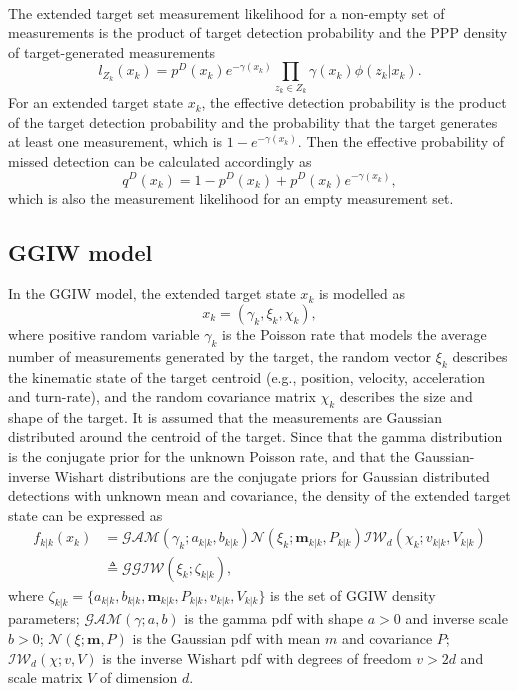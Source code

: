 ~\\
The extended target set measurement likelihood for a non-empty set of measurements is the product of target detection probability and the PPP density of target-generated measurements \cite{pmbmextended2}
\begin{equation}
    l_{Z_k}(x_k) = p^D(x_k)e^{-\gamma(x_k)}\prod_{z_k\in Z_k}\gamma(x_k)\phi(z_k|x_k).
    \label{eq:extendedlikelihood}
\end{equation}
For an extended target state $x_k$, the effective detection probability is the product of the target detection probability and the probability that the target generates at least one measurement, which is $1-e^{-\gamma(x_k)}$. Then the effective probability of missed detection can be calculated accordingly as
\begin{equation}
    q^D(x_k) = 1 - p^D(x_k) + p^D(x_k)e^{-\gamma(x_k)},
\end{equation}
which is also the measurement likelihood for an empty measurement set.

\subsection{GGIW model}
In the GGIW model, the extended target state $x_k$ is modelled as 
\begin{equation}
    x_k=(\gamma_k,\xi_k,\chi_k),
\end{equation}
where positive random variable $\gamma_k$ is the Poisson rate that models the average number of measurements generated by the target, the random vector $\xi_k$ describes the kinematic state of the target centroid (e.g., position, velocity, acceleration and turn-rate), and the random covariance matrix $\chi_k$ describes the size and shape of the target. It is assumed that the measurements are Gaussian distributed around the centroid of the target. Since that the gamma distribution is the conjugate prior for the unknown Poisson rate, and that the Gaussian-inverse Wishart distributions are the conjugate priors for Gaussian distributed detections with unknown mean and covariance, the density of the extended target state can be expressed as
\begin{align}
f_{k|k}(x_k) &= \mathcal{GAM}(\gamma_k;a_{k|k},b_{k|k})\mathcal{N}(\xi_k;\mathbf{m}_{k|k},P_{k|k})\mathcal{IW}_d(\chi_k;v_{k|k},V_{k|k}) \\
&\triangleq \mathcal{GGIW}(\xi_k;\zeta_{k|k}),
\end{align}
where $\zeta_{k|k} = \{a_{k|k},b_{k|k},\mathbf{m}_{k|k},P_{k|k},v_{k|k},V_{k|k}\}$ is the set of GGIW density parameters; $\mathcal{GAM}(\gamma;a,b)$ is the gamma pdf with shape $a>0$ and inverse scale $b>0$; $\mathcal{N}(\xi;\mathbf{m},P)$ is the Gaussian pdf with mean $m$ and covariance $P$; $\mathcal{IW}_d(\chi;v,V)$ is the inverse Wishart pdf with degrees of freedom $v>2d$ and scale matrix $V$ of dimension $d$.

